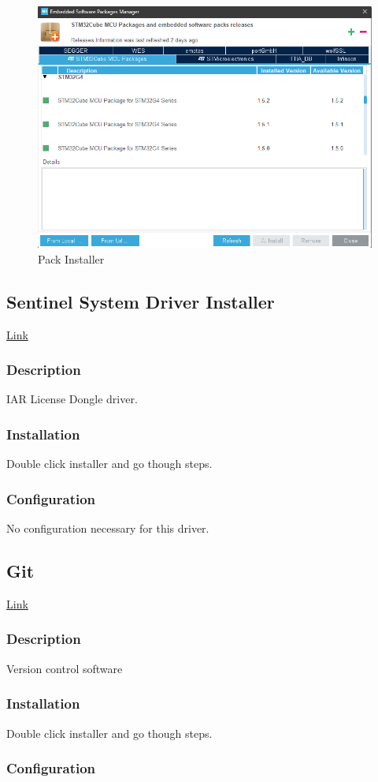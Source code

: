 \documentclass[10pt]{article}
\begin{document}
                \begin{figure}[H]
                    \centerline{\includegraphics[width=\textwidth]{References/Pack Installer.png}}
                    \caption{Pack Installer}
                \end{figure}
		\FloatBarrier \subsection{Sentinel System Driver Installer}
            \href{https://supportportal.thalesgroup.com/csm?id=kb_article_view&sys_kb_id=e88691ba37edcb08cc47261953990e80&sysparm_article=KB0016514}{Link}
			\FloatBarrier \subsubsection{Description} 
                IAR License Dongle driver.
			\FloatBarrier \subsubsection{Installation}
                Double click installer and go though steps.
			\FloatBarrier \subsubsection{Configuration}
                No configuration necessary for this driver.
		\FloatBarrier \subsection{Git}
            \href{https://git-scm.com/downloads}{Link}
			\FloatBarrier \subsubsection{Description} 
                Version control software
			\FloatBarrier \subsubsection{Installation}
                Double click installer and go though steps.
			\FloatBarrier \subsubsection{Configuration}
\end{document}
